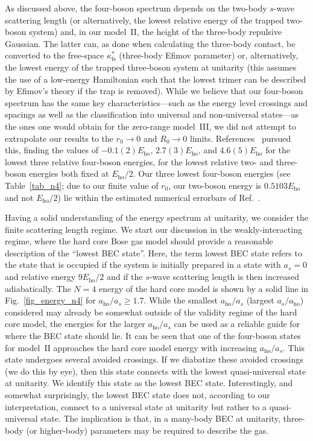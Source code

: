 \documentclass[aps,pra,twocolumn,showpacs,superscriptaddress]{revtex4}
\begin{document}
As discussed above, the four-boson spectrum depends on
the two-body $s$-wave scattering length (or alternatively, the
lowest relative energy of the trapped two-boson system) and,
in our model~II, the
height of the three-body repulsive Gaussian. The latter can, as done
when calculating the three-body contact, be converted to
the free-space $\kappa^*_{\text{fs}}$ (three-body Efimov parameter)
or, alternatively, the lowest energy of the trapped 
three-boson system at unitarity (this assumes the use of a
low-energy Hamiltonian such that the lowest trimer can be described
by Efimov's theory if the trap is removed).
While we believe that our four-boson spectrum has the same
key
characteristics---such as the energy level crossings
and spacings as well as the classification into
universal and non-universal states---as the ones one would 
obtain for the zero-range model~III,
we did not attempt to extrapolate our results to the 
$r_0 \rightarrow 0$ and
$R_0 \rightarrow 0$ limits.
References~\cite{toelle2011,toelle2013} pursued this, finding
the values of $-0.1(2)E_{\text{ho}}$, $2.7(3)E_{\text{ho}}$, and
$4.6(5)E_{\text{ho}}$ for the lowest three relative four-boson 
energies, for the lowest relative two- and three-boson energies
both fixed at $E_{\text{ho}}/2$.
Our three lowest four-boson energies (see Table~\ref{tab_n4};
due to our finite
value of $r_0$,
our two-boson energy is $0.5103E_{\text{ho}}$ and not $E_{\text{ho}}/2$)
lie within the estimated numerical errorbars of Ref.~\cite{toelle2013}.



Having a solid understanding of the energy spectrum at unitarity,
we consider the finite scattering length regime.
We start our discussion in the weakly-interacting regime,
where the hard core Bose gas model should provide a reasonable description
of the ``lowest BEC state''. Here, the term lowest BEC
state refers to the state that is occupied if the system
is initially prepared in a state with $a_s=0$ and
relative energy $9 E_{\text{ho}}/2$ and if the
$s$-wave scattering length is then increased adiabatically.
The $N=4$ energy of the hard core model is shown by
a solid line in Fig.~\ref{fig_energy_n4} for $a_{\text{ho}}/a_s \ge 1.7$.
While the smallest $a_{\text{ho}}/a_s$ (largest $a_s/a_{\text{ho}}$) considered
may already be somewhat outside of the validity regime
of the hard core model, the energies for the larger $a_{\text{ho}}/a_s$
can be used as a reliable guide for where
the BEC state should lie.
It can be seen that one of the four-boson states for model~II
approaches the hard core model energy with increasing $a_{\text{ho}}/a_s$.
This state undergoes several avoided
crossings. If we diabatize these avoided
crossings (we do this by eye), then this state connects with the lowest
quasi-universal
state at unitarity. We identify this
state as the lowest BEC state.
Interestingly, and somewhat surprisingly,
the lowest BEC state does not, according to our interpretation,
connect to a universal state at unitarity but rather to a 
quasi-universal state.
The implication is that, in a many-body BEC at unitarity,
three-body (or higher-body) parameters may be required to describe the
gas.
\end{document}
